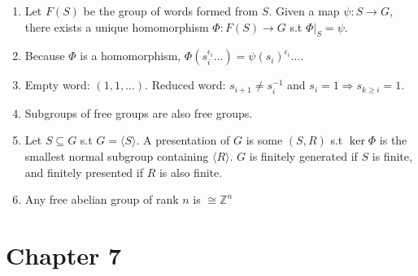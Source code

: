 \documentclass{article}
\begin{document}
\begin{enumerate}[1.]
    \item Let $F(S)$ be the group of words formed from $S$.
        Given a map $\psi : S \rightarrow G$, there exists a unique
        homomorphism $\Phi : F(S) \rightarrow G$ s.t $\Phi|_S = \psi$.
    \item Because $\Phi$ is a homomorphism, $\Phi(s_i^{\epsilon_i} ...) =
        \psi(s_i)^{\epsilon_i} ...$.
    \item Empty word: $(1, 1, ...)$. Reduced word: $s_{i+1} \not= s_i^{-1}$
        and $s_i = 1 \Rightarrow s_{k \geq i} = 1$.
    \item Subgroups of free groups are also free groups.
    \item Let $S \subseteq G$ s.t $G = \langle S \rangle$. A presentation of
        $G$ is some $(S, R)$ s.t $\ker \Phi$ is the smallest normal subgroup
        containing $\langle R \rangle$. $G$ is finitely generated if $S$ is
        finite, and finitely presented if $R$ is also finite.
    \item Any free abelian group of rank $n$ is $\cong \mathbb{Z}^n$
\end{enumerate}

\section*{Chapter 7}
\end{document}
